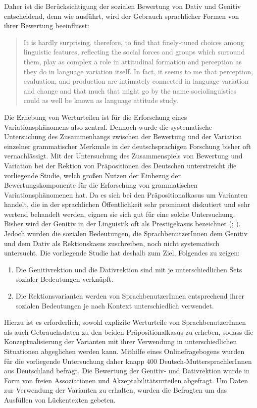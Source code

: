 Daher ist die Berücksichtigung der sozialen Bewertung von Dativ und Genitiv entscheidend, denn wie \citet[45]{Preston2004} ausführt, wird der Gebrauch sprachlicher Formen von ihrer Bewertung beeinflusst: 
\begin{quote}It is hardly surprising, therefore, to find that finely-tuned choices among linguistic features, reflecting the social forces and groups which surround them, play as complex a role in attitudinal formation and perception as they do in language variation itself. In fact, it seems to me that perception, evaluation, and production are intimately connected in language variation and change and that much that might go by the name \glqq sociolinguistics\grqq{} could as well be known as \glqq language attitude study\grqq.~\citep[45]{Preston2004}\end{quote}
Die Erhebung von Werturteilen ist für die Erforschung eines Variationsphänomens also zentral. 
Dennoch wurde die systematische Untersuchung des Zusammenhangs zwischen der Bewertung und der Variation einzelner grammatischer Merkmale in der deutschsprachigen Forschung bisher oft vernachlässigt. %
Mit der Untersuchung des Zusammenspiels von Bewertung und Variation bei der Rektion von Präpositionen des Deutschen unterstreicht die vorliegende Studie, welch großen Nutzen der Einbezug der Bewertungskomponente für die Erforschung von grammatischen Variationsphänomenen hat. %
Da es sich bei den Präpositionalkasus um Varianten handelt, die in der sprachlichen Öffentlichkeit sehr prominent diskutiert und sehr wertend behandelt werden, eignen sie sich gut für eine solche Untersuchung.  
Bisher wird der Genitiv in der Linguistik oft als \glqq Prestigekasus\grqq{} bezeichnet (\citealp[s. etwa][36]{Lehmann1992}; \citealp[6]{Zimmer.2018}). 
Jedoch wurden die sozialen Bedeutungen, die SprachbenutzerInnen dem Genitiv und dem Dativ als Rektionskasus zuschreiben, noch nicht systematisch untersucht. 
Die vorliegende Studie hat deshalb zum Ziel, Folgendes zu zeigen: 
\begin{enumerate}
\item Die Genitivrektion und die Dativrektion sind mit je unterschiedlichen Sets sozialer Bedeutungen verknüpft. 
\item Die Rektionsvarianten werden von SprachbenutzerInnen entsprechend ihrer sozialen Bedeutungen je nach Kontext unterschiedlich verwendet. 
\end{enumerate}
Hierzu ist es erforderlich, sowohl explizite Werturteile von SprachbenutzerInnen als auch Gebrauchsdaten zu den beiden Präpositionalkasus zu erheben, sodass die Konzeptualisierung der Varianten mit ihrer Verwendung in unterschiedlichen Situationen abgeglichen werden kann. 
Mithilfe eines Onlinefragebogens wurden für die vorliegende Untersuchung daher knapp 400 Deutsch\hyp MuttersprachlerInnen aus Deutschland befragt.  
Die Bewertung der Genitiv- und Dativrektion wurde in Form von freien Assoziationen und Akzeptabilitätsurteilen abgefragt. 
Um Daten zur Verwendung der Varianten zu erhalten, wurden die Befragten um das Ausfüllen von Lückentexten gebeten. 

